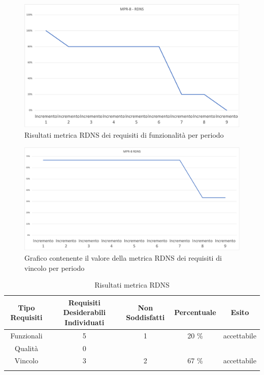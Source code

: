 \begin{center}
        \begin{figure}[!htb]
        \centering
        \includegraphics[scale=0.40]{res/images/ra/RA_RDNS_FUNZ.png}
        \caption{Risultati metrica RDNS dei requisiti di funzionalità per periodo}
    \end{figure}
    \begin{figure}[!htb]
        \centering
        \includegraphics[scale=0.40]{res/images/ra/RA_RDNS_VINC.png}
        \caption{Grafico contenente il valore della metrica RDNS dei requisiti di vincolo per periodo}
    \end{figure}
    \begin{center}
    \end{center}
\end{center}

\begin{center}
    \begin{longtable}{|c|c|c|c|c|}
        \hline
        \rowcolor{lighter-grayer}
        \textbf {Tipo Requisiti} & \textbf{Requisiti Desiderabili Individuati} & \textbf{Non Soddisfatti} & \textbf{Percentuale} & \textbf{Esito} \\ \hline
        \endfirsthead

        \hline
        Funzionali & 5 & 1 & 20 \%  &  accettabile                \\
           Qualità & 0 &  &  &                        \\
           Vincolo & 3 &  2 &  67 \%&    accettabile                    \\ 
        \hline
        \rowcolor{white}
        \caption{Risultati metrica RDNS}
    \end{longtable}
\end{center}

